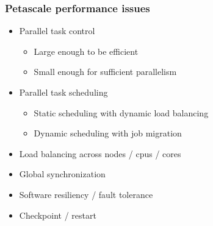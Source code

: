 \begin{frame}[fragile] \frametitle{Petascale performance issues}
   \begin{itemize}
      \item {}Parallel task control
      \begin{itemize}
          \item {}Large enough to be efficient
          \item {}Small enough for sufficient parallelism
      \end{itemize}
      \item {}Parallel task scheduling
      \begin{itemize}
          \item {}Static scheduling with dynamic load balancing
          \item {}Dynamic scheduling with job migration
      \end{itemize}
      \item {}Load balancing across nodes / cpus / cores
      \item {}Global synchronization
      \item {}Software resiliency / fault tolerance
      \item {}Checkpoint / restart
   \end{itemize}
\end{frame}

